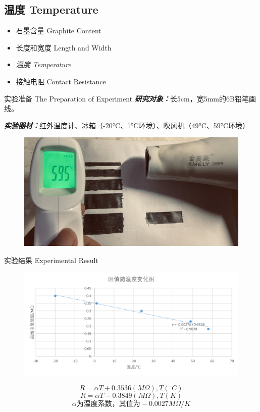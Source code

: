 \documentclass[10pt]{beamer}
\begin{document}
	
	\subsection{温度 Temperature}
	\begin{frame}%
		\begin{itemize}
			\item 石墨含量 Graphite Content
			\item 长度和宽度 Length and Width
			\item {\LARGE \textit{温度 Temperature}}
			\item 接触电阻 Contact Resistance
		\end{itemize}
	\end{frame}
	
	\begin{frame}{实验准备 The Preparation of Experiment}
		\textbf{\textit{研究对象：}}长5cm，宽5mm的6B铅笔画线。
		\bigskip
		
		\textbf{\textit{实验器材：}}红外温度计、冰箱（-20°C、1°C环境）、吹风机（49°C、59°C环境）\pause
		\begin{figure}
			\centering
			\includegraphics[width=0.76\linewidth]{figs/h}
		\end{figure}
	\end{frame}
	
	\begin{frame}{实验结果 Experimental Result}
		\begin{figure}
			\centering
			\includegraphics[width=0.8\linewidth]{figs/i}
		\end{figure}\pause
		\begin{theorem}
			\[ R=\alpha T+0.3536(M\Omega), T(^\circ C) \]
			\[ R=\alpha T-0.3849(M\Omega), T(K) \]
			$$ \alpha\text{为温度系数，其值为}-0.0027M\Omega /K $$
			
		\end{theorem}
	\end{frame}
	
\end{document}
